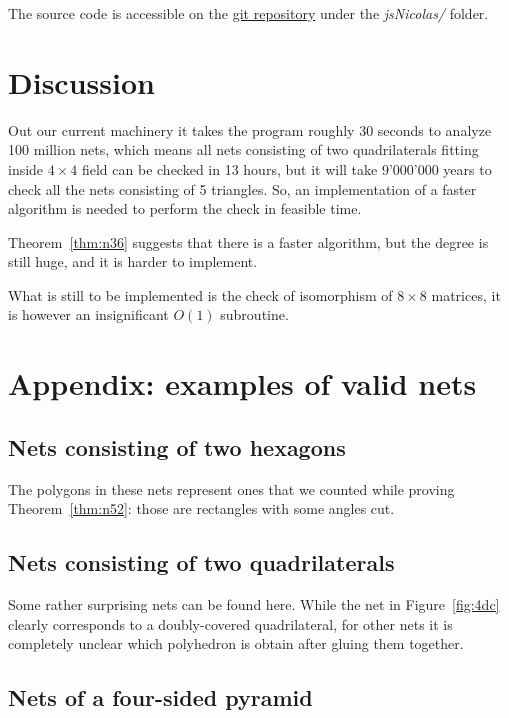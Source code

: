 \documentclass[a4paper,11pt]{article}
\begin{document}
The source code is accessible on the \href{https://github.com/boris-a-zolotov/infof420-geodesics}{git repository} under the \textit{jsNicolas/} folder.

\section{Discussion}

Out our current machinery it takes the program roughly 30 seconds to analyze 100 million nets, which means all nets consisting of two quadrilaterals fitting inside $4 \times 4$ field can be checked in 13 hours, but it will take 9'000'000 years to check all the nets consisting of 5 triangles. So, an implementation of a faster algorithm is needed to perform the check in feasible time.

Theorem~\ref{thm:n36} suggests that there is a faster algorithm, but the degree is still huge, and it is harder to implement.

What is still to be implemented is the check of isomorphism of $8 \times 8$ matrices, it is however an insignificant $O(1)$ subroutine.

\section*{Appendix: examples of valid nets}

\subsection*{Nets consisting of two hexagons}

The polygons in these nets represent ones that we counted while proving Theorem~\ref{thm:n52}: those are rectangles with some angles cut.



\subsection*{Nets consisting of two quadrilaterals}

Some rather surprising nets can be found here. While the net in Figure~\ref{fig:4dc} clearly corresponds to a doubly-covered quadrilateral, for other nets it is completely unclear which polyhedron is obtain after gluing them together.



\subsection*{Nets of a four-sided pyramid}
\end{document}

